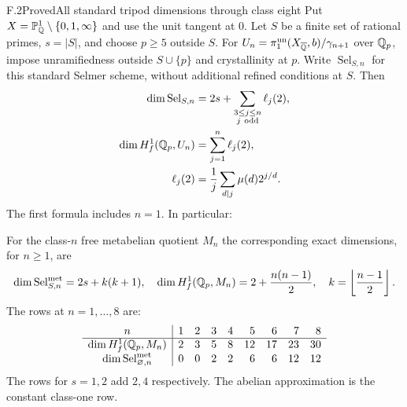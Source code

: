\begin{statement}{F.2}{Proved}{All standard tripod dimensions through class eight}
Put $X=\mathbb P^1_\mathbb Q\setminus\{0,1,\infty\}$ and use the
unit tangent at $0$. Let $S$ be a finite set of rational
primes, $s=|S|$, and choose $p\ge5$ outside $S$.
For $U_n=\pi_1^{\rm un}(X_{\overline{\mathbb Q}},b)/\gamma_{n+1}$
over $\mathbb Q_p$, impose unramifiedness outside $S\cup\{p\}$
and crystallinity at $p$. Write $\operatorname{Sel}_{S,n}$
for this standard Selmer scheme, without additional refined
conditions at $S$. Then
\[
\begin{split}
 \dim\operatorname{Sel}_{S,n}
  &=2s+\sum_{\substack{3\le j\le n\\j\ {\rm odd}}}\ell_j(2),\\
 \dim H_f^1(\mathbb Q_p,U_n)&=\sum_{j=1}^n\ell_j(2),\\
 \ell_j(2)&=\frac1j\sum_{d\mid j}\mu(d)2^{j/d}.
\end{split}
\]
The first formula includes $n=1$. In particular:
\end{statement}

For the class-$n$ free metabelian quotient $M_n$ the corresponding
exact dimensions, for $n\ge1$, are
\[
 \dim\operatorname{Sel}^{\rm met}_{S,n}
       =2s+k(k+1),\quad
 \dim H_f^1(\mathbb Q_p,M_n)=2+\frac{n(n-1)}2,\quad
 k=\left\lfloor\frac{n-1}{2}\right\rfloor.
\]
The rows at $n=1,\ldots,8$ are:
\[
\begin{array}{c|rrrrrrrr}
n&1&2&3&4&5&6&7&8\\\hline
\dim H_f^1(\mathbb Q_p,M_n)&2&3&5&8&12&17&23&30\\
\dim\operatorname{Sel}^{\rm met}_{\varnothing,n}
 &0&0&2&2&6&6&12&12
\end{array}
\]
The rows for $s=1,2$ add $2,4$ respectively. The abelian
approximation is the constant class-one row.
